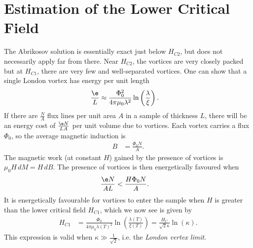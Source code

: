 \documentclass[qo.tex]{subfiles}
\begin{document}
\section{Estimation of the Lower Critical Field}
The Abrikosov solution is essentially exact just below $H_{C2}$, but does not necessarily apply far from there. 
Near $H_{C2}$, the vortices are very closely packed but at $H_{C1}$, there are very few and well-separated vortices. 
One can show that a single London vortex has energy per unit length 
\begin{align}
    \frac{\e}{L} &\approx \frac{\Phi_0^2}{4\pi\mu_0\lambda^2}\ln\left(\frac{\lambda}{\xi}\right).
\end{align}
If there are $\frac{N}{A}$ flux lines per unit area $A$ in a sample of thickness $L$, there will be an energy cost of $\frac{\e N}{LA}$ per unit volume due to vortices. 
Each vortex carries a flux $\Phi_0$, so the average magnetic induction is 
\begin{align}
    B &= \frac{\Phi_0N}{A}.
\end{align}
The magnetic work (at constant $H$) gained by the presence of vortices is $\mu_0H\,dM = H\,dB$.
The presence of vortices is then energetically favoured when 
\begin{align}
    \frac{\e N}{AL} &< \frac{H\Phi_0N}{A}.
\end{align}
It is energetically favourable for vortices to enter the sample when $H$ is greater than the lower critical field $H_{C1}$, which we now see is given by
\begin{align}
    H_{C1} &= \frac{\Phi_0}{4\pi\mu_0\lambda(T)^2}\ln\left(\frac{\lambda(T)}{\xi(T)}\right) = \frac{H_C}{\sqrt{2}\kappa}\ln(\kappa).
\end{align}
This expression is valid when $\kappa\gg\frac{1}{\sqrt{2}}$, i.e. the \emph{London vertex limit}.
\end{document}
